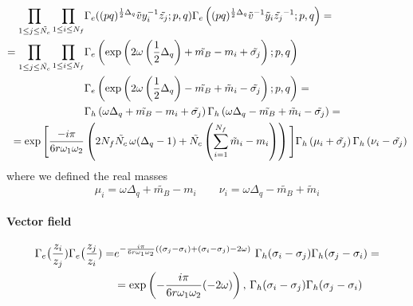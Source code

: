 \begin{appendices}
\begin{equation}
\begin{aligned}
 \prod_{ 1 \leq j \leq \tilde{N_c}} \prod_{ 1 \leq i \leq N_f} & \Gamma_e ( (pq)^{{1 \over 2 } \Delta_q} \tilde{v} y_i^{-1} \tilde{z_j} ; p,q)\Gamma_e \left( (pq)^{{1 \over 2 } \Delta_q} \tilde{v}^{-1} \tilde y_i \tilde{z_j}^{-1} ; p,q  \right)  = \\
 = \prod_{ 1 \leq j \leq \tilde{N_c}} \prod_{ 1 \leq i \leq N_f}  & \Gamma_e \left( \exp\left( 2 \omega \left( {1 \over 2 } \Delta_q \right)   + \tilde{m_B} - m_i  + \tilde{\sigma_j} \right) ; p,q \right) \\
 &\Gamma_e \left( \exp \left( 2 \omega \left(  {1 \over 2 } \Delta_q \right)  - \tilde{m_B} + \tilde  m_i  - \tilde{\sigma_j} \right) ; p,q \right)  = \\
&\Gamma_h \left(\omega \Delta_q + \tilde{m_B} - m_i  + \tilde{\sigma_j} \right) \Gamma_h \left(\omega \Delta_q - \tilde{m_B} +  \tilde m_i  - \tilde{\sigma_j} \right)  = \\
 =   
\exp \Bigg[  
 \frac{- i \pi}{6 r \omega_1 \omega_2} 
 &
 \left(
 2 N_f \tilde{N_c}\, \omega(\Delta_q-1) + \tilde{N_c} \left( 
 \sum_{i=1}^{N_f} \tilde{m}_i - m_i
 \right)
 \right)
\Bigg]
  \Gamma_h \left( \mu_i + \tilde{\sigma_j} \right) \Gamma_h \left(\nu_i - \tilde{\sigma_j} \right)
\end{aligned}
\end{equation}
where we defined the real masses
$$
 \mu_i = \omega \Delta_q + \tilde{m_B} - m_i   \qquad \nu_i  = \omega \Delta_q - \tilde{m_B} +  \tilde m_i
$$

\paragraph{Vector field}
\begin{equation}
\begin{aligned}
  \Gamma_e\big( {z_i \over z_j})\Gamma_e\big( {z_j \over z_i}) = &e^{- \frac{i \pi} {6 r \omega_1 \omega_2 }  ( (\sigma_j - \sigma_i) + (\sigma_i- \sigma_j) - 2 \omega)} \, \, \Gamma_h (  \sigma_i - \sigma_j) \Gamma_h (  \sigma_j - \sigma_i) =\\
& = \exp \left( {- \frac{i \pi} {6 r \omega_1 \omega_2 }  ( - 2 \omega)}  \right) , \, \Gamma_h (  \sigma_i - \sigma_j) \Gamma_h (  \sigma_j - \sigma_i)
\end{aligned}
\end{equation}


\end{appendices}
